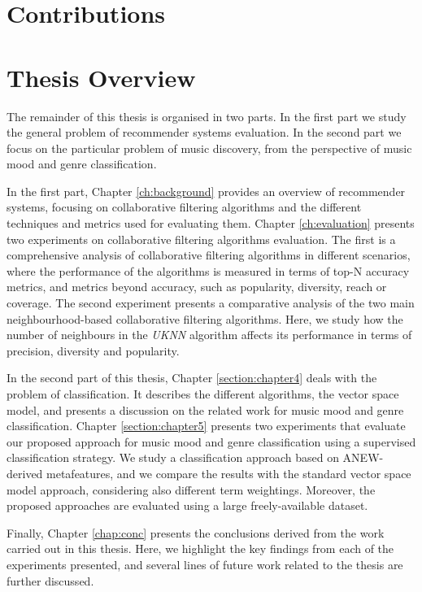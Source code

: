\blindtext



\section{Contributions}

\blindtext



\section{Thesis Overview}

The remainder of this thesis is organised in two parts. In the first part we study the general problem of recommender systems evaluation. In the second part we focus on the particular problem of music discovery, from the perspective of music mood and genre classification.


In the first part, Chapter \ref{ch:background} provides an overview of recommender systems, focusing on collaborative filtering algorithms and the different techniques and metrics used for evaluating them. Chapter \ref{ch:evaluation} presents two experiments on collaborative filtering algorithms evaluation. The first is a comprehensive analysis of collaborative filtering algorithms in different scenarios, where the performance of the algorithms is measured in terms of top-N accuracy metrics, and metrics beyond accuracy, such as popularity, diversity, reach or coverage. The second experiment presents a comparative analysis of the two main neighbourhood-based collaborative filtering algorithms. Here, we study how the number of neighbours in the \emph{UKNN} algorithm affects its performance in terms of precision, diversity and popularity.

In the second part of this thesis, Chapter \ref{section:chapter4} deals with the problem of classification. It describes the different algorithms, the vector space model, and presents a discussion on the related work for music mood and genre classification. Chapter \ref{section:chapter5} presents two experiments that evaluate our proposed approach for music mood and genre classification using a supervised classification strategy. We study a classification approach based on  ANEW-derived metafeatures, and we compare the results with the standard vector space model approach, considering also  different term weightings. Moreover, the proposed approaches are evaluated using a large freely-available dataset.


Finally, Chapter \ref{chap:conc} presents the conclusions derived from the work carried out in this thesis. Here, we highlight the key findings from  each of the experiments presented, and several lines of future work related to the thesis are further discussed.

